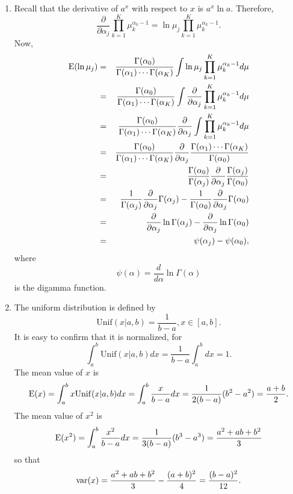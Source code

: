 \begin{enumerate}
\item Recall that the derivative of $a^x$ with respect to $x$ is $a^x\ln a$. Therefore,
\[
\frac{\partial}{\partial\alpha_j}\prod_{k=1}^K \mu_k^{\alpha_k-1} = \ln\mu_j\prod_{k=1}^K\mu_k^{\alpha_k-1}.
\]
Now,
\begin{eqnarray*}
\operatorname{E}(\ln\mu_j) &=& \frac{\Gamma(\alpha_0)}{\Gamma(\alpha_1)\cdots\Gamma(\alpha_K)}\int\ln\mu_j\prod_{k=1}^K\mu_k^{\alpha_k-1}d\mu \\
 &=& \frac{\Gamma(\alpha_0)}{\Gamma(\alpha_1)\cdots\Gamma(\alpha_K)}\int\frac{\partial}{\partial\alpha_j}\prod_{k=1}^K\mu_k^{\alpha_k-1}d\mu \\
 &=& \frac{\Gamma(\alpha_0)}{\Gamma(\alpha_1)\cdots\Gamma(\alpha_K)}\frac{\partial}{\partial\alpha_j}\int\prod_{k=1}^K\mu_k^{\alpha_k-1}d\mu \\
 &=& \frac{\Gamma(\alpha_0)}{\Gamma(\alpha_1)\cdots\Gamma(\alpha_K)}\frac{\partial}{\partial\alpha_j}\frac{\Gamma(\alpha_1)\cdots\Gamma(\alpha_K)}{\Gamma(\alpha_0)} \\
 &=& \frac{\Gamma(\alpha_0)}{\Gamma(\alpha_j)}\frac{\partial}{\partial\alpha_j}\frac{\Gamma(\alpha_j)}{\Gamma(\alpha_0)} \\
 &=& \frac{1}{\Gamma(\alpha_j)}\frac{\partial}{\partial\alpha_j}\Gamma(\alpha_j) - \frac{1}{\Gamma(\alpha_0)}\frac{\partial}{\partial\alpha_j}\Gamma(\alpha_0) \\
 &=& \frac{\partial}{\partial\alpha_j}\ln\Gamma(\alpha_j) - \frac{\partial}{\partial\alpha_j}\ln\Gamma(\alpha_0) \\
 &=& \psi(\alpha_j) - \psi(\alpha_0),
\end{eqnarray*}
where 
\[
\psi(\alpha) = \frac{d}{d\alpha}\ln\Gamma(\alpha)
\]
is the digamma function.

\item The uniform distribution is defined by
\[
\mathrm{Unif}(x|a, b) = \frac{1}{b - a}, x \in [a, b].
\]
It is easy to confirm that it is normalized, for
\[
\int_a^b \mathrm{Unif}(x|a, b)dx = \frac{1}{b-a}\int_a^b dx = 1.
\]
The mean value of $x$ is
\[
\operatorname{E}(x) = \int_a^b x\mathrm{Unif}(x|a, b)dx = \int_a^b \frac{x}{b-a}dx = \frac{1}{2(b-a)}(b^2 - a^2) = \frac{a+b}{2}.
\]
The mean value of $x^2$ is
\[
\operatorname{E}(x^2) = \int_a^b\frac{x^2}{b-a}dx = \frac{1}{3(b-a)}(b^3-a^3) = \frac{a^2 + ab + b^2}{3}
\]
so that 
\[
\operatorname{var}(x) = \frac{a^2 + ab + b^2}{3} - \frac{(a+b)^2}{4} = \frac{(b - a)^2}{12}.
\]


\end{enumerate}
